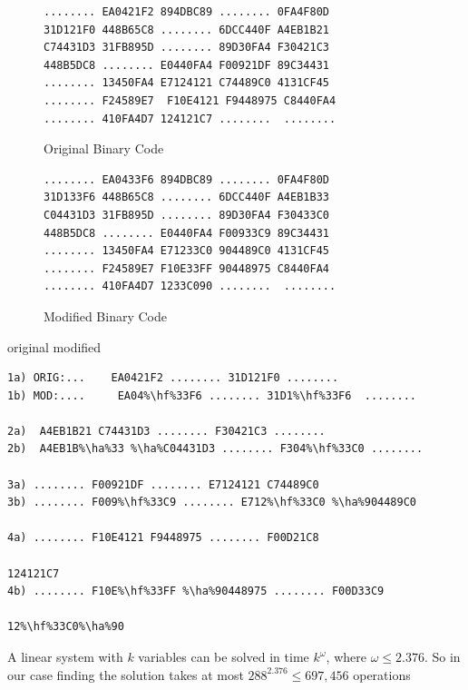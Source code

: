 \documentclass[conference]{IEEEtran}
\begin{document}
\begin{figure}[H]
\begin{lstlisting}[style=hex, frame=tlrb]
........ EA0421F2 894DBC89 ........ 0FA4F80D
31D121F0 448B65C8 ........ 6DCC440F A4EB1B21
C74431D3 31FB895D ........ 89D30FA4 F30421C3
448B5DC8 ........ E0440FA4 F00921DF 89C34431
........ 13450FA4 E7124121 C74489C0 4131CF45
........ F24589E7  F10E4121 F9448975 C8440FA4
........ 410FA4D7 124121C7 ........  ........
\end{lstlisting}
\caption{Original Binary Code}
\end{figure}

\begin{figure}[H]
\begin{lstlisting}[style=hex, frame=tlrb]
........ EA0433F6 894DBC89 ........ 0FA4F80D 
31D133F6 448B65C8 ........ 6DCC440F A4EB1B33
C04431D3 31FB895D ........ 89D30FA4 F30433C0 
448B5DC8 ........ E0440FA4 F00933C9 89C34431
........ 13450FA4 E71233C0 904489C0 4131CF45
........ F24589E7 F10E33FF 90448975 C8440FA4 
........ 410FA4D7 1233C090 ........  ........
\end{lstlisting}
\caption{Modified Binary Code}
\end{figure}


original
modified
\newcommand{\hf}{\makebox[0pt][l]{\color{green}\rule[-3pt]{0.08\linewidth}{11pt}}}
\newcommand{\ha}{\makebox[0pt][l]{\color{green}\rule[-3pt]{0.04\linewidth}{11pt}}}

\begin{lstlisting}[style=hex, frame=tlrb, escapechar=\%]
1a) ORIG:...    EA0421F2 ........ 31D121F0 ........
1b) MOD:....     EA04%\hf%33F6 ........ 31D1%\hf%33F6  ........

2a)  A4EB1B21 C74431D3 ........ F30421C3 ........
2b)  A4EB1B%\ha%33 %\ha%C04431D3 ........ F304%\hf%33C0 ........

3a) ........ F00921DF ........ E7124121 C74489C0
3b) ........ F009%\hf%33C9 ........ E712%\hf%33C0 %\ha%904489C0 

4a) ........ F10E4121 F9448975 ........ F00D21C8

124121C7
4b) ........ F10E%\hf%33FF %\ha%90448975 ........ F00D33C9

12%\hf%33C0%\ha%90
\end{lstlisting}

A linear system with $k$ variables can be solved in time $k^\omega$, where $\omega \leq 2.376$.
So in our case finding the solution takes at most $288^{2.376} \leq 697,456$ operations
\end{document}
